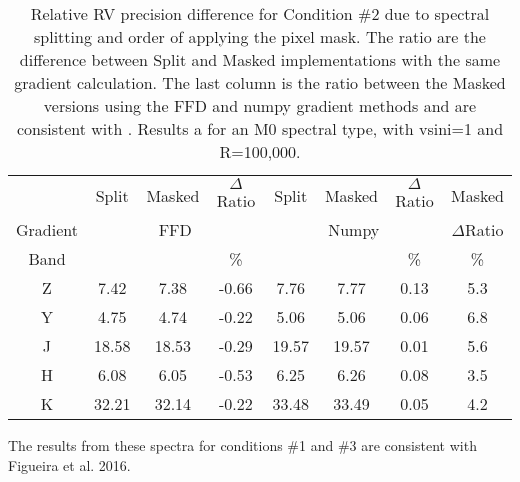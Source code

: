 
\begin{table}
    \centering
    \caption{Relative RV precision difference for Condition \#2 due to spectral splitting and order of applying the pixel mask. The ratio are the difference between Split and Masked implementations with the same gradient calculation. The last column is the ratio between the Masked versions using the FFD and numpy gradient methods and are consistent with . Results a for an M0 spectral type, with vsini=1 and R=100,000.}
    \begin{tabular}{c|ccc|ccc|c}
        \toprule
        & Split & Masked & \(\Delta\)Ratio & Split & Masked & \(\Delta\)Ratio & Masked \\
        Gradient & \multicolumn{3}{c|}{FFD}  & \multicolumn{3}{c|}{Numpy} & \(\Delta\)Ratio\\
        Band & \mps{} & \mps{} &  \%  & \mps{} & \mps{} &   \% & \% \\
        \midrule
        Z &  7.42 &  7.38 & -0.66 &  7.76 &  7.77 & 0.13 & 5.3\\
        Y &  4.75 &  4.74 & -0.22 &  5.06 &  5.06 & 0.06 & 6.8\\
        J & 18.58 & 18.53 & -0.29 & 19.57 & 19.57 & 0.01 & 5.6\\
        H &  6.08 &  6.05 & -0.53 &  6.25 &  6.26 & 0.08 & 3.5\\
        K & 32.21 & 32.14 & -0.22 & 33.48 & 33.49 & 0.05 & 4.2\\
        \bottomrule
    \end{tabular}
\end{table}

{\rd{} The results from these spectra for conditions \#1 and \#3 are consistent with Figueira et al. 2016. }
